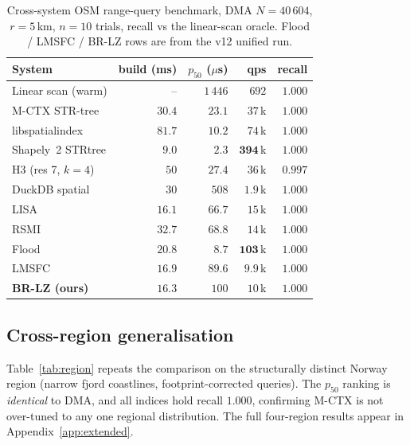 \begin{table}[t]
\centering
\caption{Cross-system OSM range-query benchmark, DMA $N{=}40\,604$,
$r{=}5$\,km, $n{=}10$ trials, recall vs the linear-scan oracle.  Flood / LMSFC / BR-LZ rows are from the v12 unified run.}\label{tab:osm-cross}
\small
\begin{tabular}{lrrrr}
\toprule
System & build (ms) & $p_{50}$ ($\mu$s) & qps & recall \\
\midrule
Linear scan (warm)   & --     & $1\,446$ & $692$   & $1.000$ \\
\midrule
M-CTX STR-tree       & $30.4$ & $23.1$   & $37$\,k & $1.000$ \\
libspatialindex      & $81.7$ & $10.2$   & $74$\,k & $1.000$ \\
Shapely~2 STRtree    & $9.0$  & $\mathbf{2.3}$ & $\mathbf{394}$\,k & $1.000$ \\
H3 (res 7, $k{=}4$)  & $50$   & $27.4$   & $36$\,k & $0.997$ \\
DuckDB spatial       & $30$   & $508$    & $1.9$\,k & $1.000$ \\
\midrule
LISA                 & $16.1$ & $66.7$   & $15$\,k & $1.000$ \\
RSMI                 & $32.7$ & $68.8$   & $14$\,k & $1.000$ \\
Flood~\cite{nathan2020flood} & $20.8$ & $\mathbf{8.7}$ & $\mathbf{103}$\,k & $1.000$ \\
LMSFC~\cite{gao2022lmsfc}    & $16.9$ & $89.6$ & $9.9$\,k & $1.000$ \\
\textbf{BR-LZ (ours)} & $\mathbf{16.3}$ & $100$ & $10$\,k & $\mathbf{1.000}$ \\
\bottomrule
\end{tabular}
\end{table}

\subsection{Cross-region generalisation}\label{ssec:cross-region}
Table~\ref{tab:region} repeats the comparison on the structurally
distinct Norway region (narrow fjord coastlines, footprint-corrected
queries). The $p_{50}$ ranking is \emph{identical} to DMA, and all
indices hold recall $1.000$, confirming M-CTX is not over-tuned to any one
regional distribution. The full four-region results appear in
Appendix~\ref{app:extended}.

